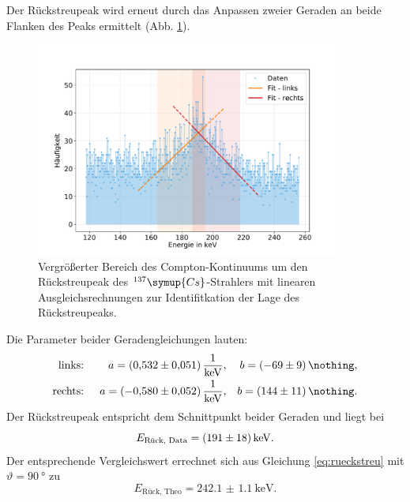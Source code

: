 Der Rückstreupeak wird erneut durch das Anpassen zweier Geraden an beide Flanken des Peaks ermittelt (Abb. \ref{fig:cs_rueck}).
\begin{figure}[h!]
  \centering
  \includegraphics[width=0.9\textwidth]{content/images/caesium_rueckstreupeak.pdf}
  \caption{Vergrößerter Bereich des Compton-Kontinuums um den Rückstreupeak des $^{137}\symup{Cs}$-Strahlers mit linearen Ausgleichsrechnungen zur Identifitkation der Lage des Rückstreupeaks.}
  \label{fig:cs_rueck}
\end{figure}
Die Parameter beider Geradengleichungen lauten:
\begin{align*}
	\text{links: }  && a = \SI{0.532 (51) }{\frac{1}{\kilo \electronvolt}},  && b = \SI{-69 (9) }{\nothing}, \\
	\text{rechts: } && a = \SI{-0.580 (52) }{\frac{1}{\kilo \electronvolt}}, && b = \SI{144 (11) }{\nothing}. \\
\end{align*}
Der Rückstreupeak entspricht dem Schnittpunkt beider Geraden und liegt bei
\begin{equation*}
	E_{\text{Rück, Data}} = \SI{191 (18)}{\kilo \electronvolt}.
\end{equation*}
Der entsprechende Vergleichswert errechnet sich aus Gleichung \eqref{eq:rueckstreu} mit $\vartheta = \SI{90}{°}$ zu
\begin{equation*}
	E_{\text{Rück, Theo}} = \SI{242.1(11)}{\kilo \electronvolt}.
\end{equation*}
